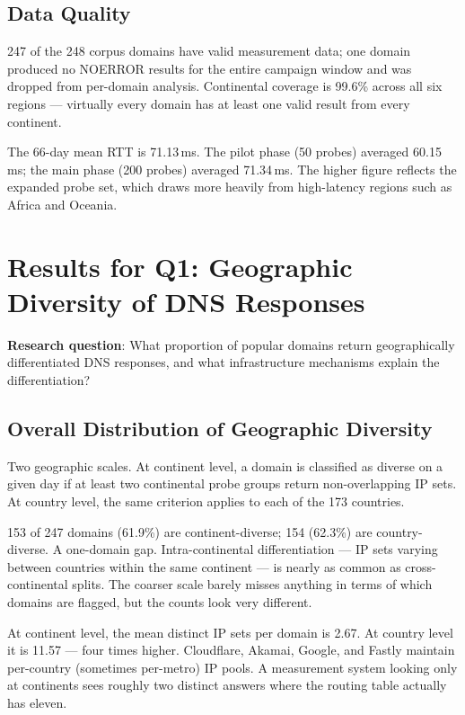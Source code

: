 \subsection{Data Quality}
\label{subsec:4.1.3}

247 of the 248 corpus domains have valid measurement data; one domain produced no NOERROR results for the entire campaign window and was dropped from per-domain analysis. Continental coverage is 99.6\% across all six regions --- virtually every domain has at least one valid result from every continent.

The 66-day mean \ac{RTT} is 71.13\,ms. The pilot phase (50 probes) averaged 60.15\,ms; the main phase (200 probes) averaged 71.34\,ms. The higher figure reflects the expanded probe set, which draws more heavily from high-latency regions such as Africa and Oceania.

\bigskip
\section{Results for Q1: Geographic Diversity of DNS Responses}
\label{sec:4.2}

\textbf{Research question}: What proportion of popular domains return geographically differentiated DNS responses, and what infrastructure mechanisms explain the differentiation?

\subsection{Overall Distribution of Geographic Diversity}
\label{subsec:4.2.1}

Two geographic scales. At continent level, a domain is classified as diverse on a given day if at least two continental probe groups return non-overlapping \ac{IP} sets. At country level, the same criterion applies to each of the 173 countries.

153 of 247 domains (61.9\%) are continent-diverse; 154 (62.3\%) are country-diverse. A one-domain gap. Intra-continental differentiation --- \ac{IP} sets varying between countries within the same continent --- is nearly as common as cross-continental splits. The coarser scale barely misses anything in terms of which domains are flagged, but the counts look very different.

At continent level, the mean distinct \ac{IP} sets per domain is 2.67. At country level it is 11.57 --- four times higher. Cloudflare, Akamai, Google, and Fastly maintain per-country (sometimes per-metro) \ac{IP} pools. A measurement system looking only at continents sees roughly two distinct answers where the routing table actually has eleven.

